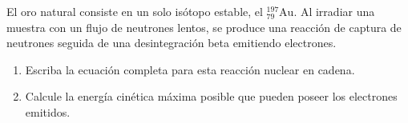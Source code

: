 \item El oro natural consiste en un solo isótopo estable, el $^{197}_{79}\text{Au}$. Al irradiar una muestra con un flujo de neutrones lentos, se produce una reacción de captura de neutrones seguida de una desintegración beta emitiendo electrones.
\begin{enumerate}
    \item Escriba la ecuación completa para esta reacción nuclear en cadena.
    \item Calcule la energía cinética máxima posible que pueden poseer los electrones emitidos.
\end{enumerate}